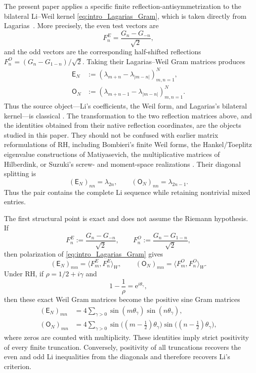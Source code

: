\documentclass[11pt]{amsart}
\numberwithin{equation}{section}
\theoremstyle{plain}
\theoremstyle{definition}
\theoremstyle{remark}
\newcommand{\RH}{\mathrm{RH}}
\newcommand{\E}{\mathsf E}
\newcommand{\Omat}{\mathsf O}
\newcommand{\e}{\mathrm e}
\begin{document}
The present paper applies a specific finite reflection-antisymmetrization to the bilateral
Li--Weil kernel \eqref{eq:intro_Lagarias_Gram}, which is taken directly from
Lagarias~\cite[Theorem~3.1]{Lagarias2007}.  More precisely, the even test vectors are
\[
F_n^E=\frac{G_n-G_{-n}}{\sqrt2},
\]
and the odd vectors are the corresponding half-shifted reflections
\(F_n^O=(G_n-G_{1-n})/\sqrt2\).  Taking their Lagarias--Weil Gram matrices produces
\begin{align}
\E_N
&:=\left(\lambda_{m+n}-\lambda_{|m-n|}\right)_{m,n=1}^N,
\label{eq:intro_E_definition}\\
\Omat_N
&:=\left(\lambda_{m+n-1}-\lambda_{|m-n|}\right)_{m,n=1}^N.
\label{eq:intro_O_definition}
\end{align}
Thus the source object---Li's coefficients, the Weil form, and Lagarias's bilateral kernel---is
classical \cite{Li1997,BombieriLagarias1999,Lagarias2007}.  The transformation to the two
reflection matrices above, and the identities obtained from their native reflection coordinates, are
the objects studied in this paper.  They should not be confused with earlier matrix reformulations of
RH, including Bombieri's finite Weil forms, the Hankel/Toeplitz eigenvalue constructions of
Matiyasevich, the multiplicative matrices of Hilberdink, or Suzuki's screw- and moment-space
realizations \cite{Bombieri2000,Matiyasevich2007a,Matiyasevich2007b,Hilberdink2006,Hilberdink2015,Suzuki2023Screw}.
Their diagonal splitting is
\begin{equation}
(\E_N)_{nn}=\lambda_{2n},
\qquad
(\Omat_N)_{nn}=\lambda_{2n-1}.
\label{eq:intro_diagonals}
\end{equation}
Thus the pair contains the complete Li sequence while retaining nontrivial mixed entries.

The first structural point is exact and does not assume the Riemann hypothesis. If
\begin{equation}
F_n^E:=\frac{G_n-G_{-n}}{\sqrt2},
\qquad
F_n^O:=\frac{G_n-G_{1-n}}{\sqrt2},
\label{eq:intro_reflected_tests}
\end{equation}
then polarization of \eqref{eq:intro_Lagarias_Gram} gives
\begin{equation}
(\E_N)_{mn}=\langle F_m^E,F_n^E\rangle_W,
\qquad
(\Omat_N)_{mn}=\langle F_m^O,F_n^O\rangle_W.
\label{eq:intro_exact_Weil_Gram}
\end{equation}
Under $\RH$, if $\rho=1/2+i\gamma$ and
\begin{equation}
1-\frac1\rho=\e^{i\theta_\gamma},
\label{eq:intro_cayley}
\end{equation}
then these exact Weil Gram matrices become the positive sine Gram matrices
\begin{align}
(\E_N)_{mn}
&=4\sum_{\gamma>0}\sin(m\theta_\gamma)\sin(n\theta_\gamma),
\label{eq:intro_gram_E}\\
(\Omat_N)_{mn}
&=4\sum_{\gamma>0}\sin\bigl((m-\tfrac12)\theta_\gamma\bigr)
\sin\bigl((n-\tfrac12)\theta_\gamma\bigr),
\label{eq:intro_gram_O}
\end{align}
where zeros are counted with multiplicity. These identities imply strict positivity of every finite truncation. Conversely, positivity of all truncations recovers the even and odd Li inequalities from the diagonals and therefore recovers Li's criterion.
\end{document}
